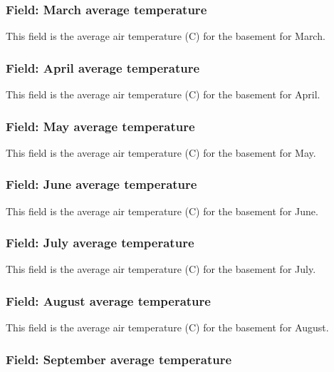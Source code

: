 \subsubsection{Field: March average temperature}\label{field-march-average-temperature}

This field is the average air temperature (C) for the basement for March.

\subsubsection{Field: April average temperature}\label{field-april-average-temperature}

This field is the average air temperature (C) for the basement for April.

\subsubsection{Field: May average temperature}\label{field-may-average-temperature}

This field is the average air temperature (C) for the basement for May.

\subsubsection{Field: June average temperature}\label{field-june-average-temperature}

This field is the average air temperature (C) for the basement for June.

\subsubsection{Field: July average temperature}\label{field-july-average-temperature}

This field is the average air temperature (C) for the basement for July.

\subsubsection{Field: August average temperature}\label{field-august-average-temperature}

This field is the average air temperature (C) for the basement for August.

\subsubsection{Field: September average temperature}\label{field-september-average-temperature}

